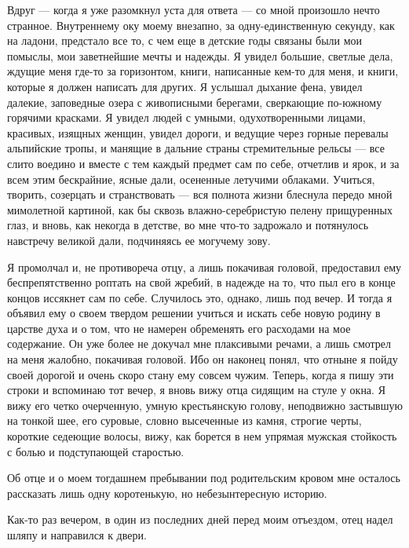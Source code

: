 Вдруг --- когда я уже разомкнул  уста для ответа --- со мной произошло
нечто странное.  Внутреннему оку моему внезапно,  за одну-единственную
секунду, как  на ладони, предстало  все то, с  чем еще в  детские годы
связаны были  мои помыслы, мои  заветнейшие мечты и надежды.  Я увидел
большие,  светлые  дела,  ждущие  меня где-то  за  горизонтом,  книги,
написанные кем-то  для меня,  и книги, которые  я должен  написать для
других. Я  услышал дыхание  фена, увидел  далекие, заповедные  озера с
живописными берегами, сверкающие по-южному горячими красками. Я увидел
людей  с умными,  одухотворенными  лицами,  красивых, изящных  женщин,
увидел дороги,  и ведущие  через горные  перевалы альпийские  тропы, и
манящие в дальние страны стремительные  рельсы --- все слито воедино и
вместе с тем  каждый предмет сам по  себе, отчетлив и ярок,  и за всем
этим  бескрайние, ясные  дали, осененные  летучими облаками.  Учиться,
творить,  созерцать и  странствовать  --- вся  полнота жизни  блеснула
передо  мной мимолетной  картиной,  как  бы сквозь  влажно-серебристую
пелену прищуренных глаз, и вновь, как некогда в детстве, во мне что-то
задрожало и потянулось навстречу  великой дали, подчиняясь ее могучему
зову.

Я  промолчал  и,  не  противореча  отцу,  а  лишь  покачивая  головой,
предоставил ему беспрепятственно роптать на  свой жребий, в надежде на
то, что  пыл его в конце  концов иссякнет сам по  себе. Случилось это,
однако, лишь под вечер. И тогда  я объявил ему о своем твердом решении
учиться и  искать себе  новую родину в  царстве духа и  о том,  что не
намерен обременять  его расходами на  мое содержание. Он уже  более не
докучал  мне  плаксивыми  речами,  а лишь  смотрел  на  меня  жалобно,
покачивая  головой. Ибо  он наконец  понял, что  отныне я  пойду своей
дорогой и очень скоро стану ему совсем чужим. Теперь, когда я пишу эти
строки  и вспоминаю  тот вечер,  я вновь  вижу отца  сидящим на  стуле
у  окна.  Я вижу  его  четко  очерченную, умную  крестьянскую  голову,
неподвижно застывшую на тонкой шее,  его суровые, словно высеченные из
камня, строгие  черты, короткие седеющие  волосы, вижу, как  борется в
нем упрямая мужская стойкость с болью и подступающей старостью.

Об  отце и  о моем  тогдашнем пребывании  под родительским  кровом мне
осталось рассказать лишь одну коротенькую, но небезынтересную историю.

Как-то раз вечером, в один из последних дней перед моим отъездом, отец
надел шляпу и направился к двери.

